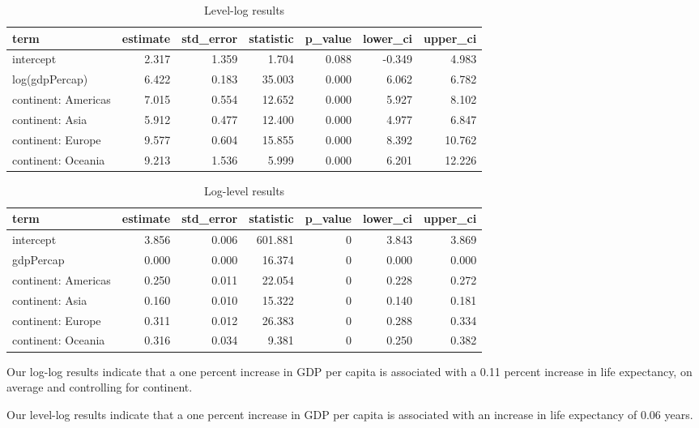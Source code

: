 \documentclass[
]{book}
\begin{document}
\begin{table}

\caption{\label{tab:levlogtab}Level-log results}
\centering
\begin{tabular}[t]{l|r|r|r|r|r|r}
\hline
term & estimate & std\_error & statistic & p\_value & lower\_ci & upper\_ci\\
\hline
intercept & 2.317 & 1.359 & 1.704 & 0.088 & -0.349 & 4.983\\
\hline
log(gdpPercap) & 6.422 & 0.183 & 35.003 & 0.000 & 6.062 & 6.782\\
\hline
continent: Americas & 7.015 & 0.554 & 12.652 & 0.000 & 5.927 & 8.102\\
\hline
continent: Asia & 5.912 & 0.477 & 12.400 & 0.000 & 4.977 & 6.847\\
\hline
continent: Europe & 9.577 & 0.604 & 15.855 & 0.000 & 8.392 & 10.762\\
\hline
continent: Oceania & 9.213 & 1.536 & 5.999 & 0.000 & 6.201 & 12.226\\
\hline
\end{tabular}
\end{table}

\begin{table}

\caption{\label{tab:loglevtab}Log-level results}
\centering
\begin{tabular}[t]{l|r|r|r|r|r|r}
\hline
term & estimate & std\_error & statistic & p\_value & lower\_ci & upper\_ci\\
\hline
intercept & 3.856 & 0.006 & 601.881 & 0 & 3.843 & 3.869\\
\hline
gdpPercap & 0.000 & 0.000 & 16.374 & 0 & 0.000 & 0.000\\
\hline
continent: Americas & 0.250 & 0.011 & 22.054 & 0 & 0.228 & 0.272\\
\hline
continent: Asia & 0.160 & 0.010 & 15.322 & 0 & 0.140 & 0.181\\
\hline
continent: Europe & 0.311 & 0.012 & 26.383 & 0 & 0.288 & 0.334\\
\hline
continent: Oceania & 0.316 & 0.034 & 9.381 & 0 & 0.250 & 0.382\\
\hline
\end{tabular}
\end{table}

Our log-log results indicate that a one percent increase in GDP per capita is associated with a 0.11 percent increase in life expectancy, on average and controlling for continent.

Our level-log results indicate that a one percent increase in GDP per capita is associated with an increase in life expectancy of 0.06 years.
\end{document}

